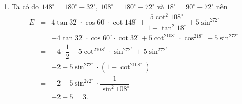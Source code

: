 \begin{bt}
{\begin{enumerate}
	\allowdisplaybreaks
	\begin{eqnarray*}
		D&=& \dfrac{12}{1+\tan^273^\circ} -4\tan 75^\circ\cdot\cot 105^\circ+12\sin^2 107^\circ-2 \tan 40^\circ \cdot \cos 60^\circ \cdot \tan 50^\circ\\
		&=&12\cos^273^\circ-4\tan75^\circ\cdot\cot(180^\circ-75^\circ)+12\sin^2(180^\circ-73^\circ)-2\tan(90^\circ-50)\cos60^\circ\tan 50^\circ\\
		&=&12\cos^273^\circ+4\tan75^\circ\cdot\cot75^\circ+12\sin^273^\circ-\cot 50^\circ\cdot \tan 50^\circ\cdot \cos 60^\circ\\
		&=&12+4-\dfrac{1}{2}=\dfrac{31}{2}.
	\end{eqnarray*}
	\item Ta có do $148^\circ=180^\circ-32^\circ$, $108^\circ=180^\circ-72^\circ$ và $18^\circ=90^\circ-72^\circ$ nên
	\allowdisplaybreaks
	\begin{eqnarray*}
		E&=&4 \tan 32^\circ \cdot \cos 60^\circ \cdot \cot 148^\circ+\dfrac{5 \cot^2 108^\circ}{1+\tan^2 18^\circ}+5\sin^272^\circ\\
		&=&-4 \tan 32^\circ \cdot \cos 60^\circ \cdot \cot 32^\circ+5\cot^2108^\circ\cdot\cos^218^\circ+5\sin^272^\circ\\
		&=&-4\cdot\dfrac{1}{2}+5\cot^2108^\circ\cdot\sin^272^\circ+5\sin^272^\circ\\
		&=&-2+5\sin^272^\circ\cdot\left(1+\cot^2108^\circ\right)\\
		&=&-2+5\sin^272^\circ\cdot \dfrac{1}{\sin^2 108^\circ}\\
		&=&-2+5=3.
	\end{eqnarray*}
\end{enumerate}	
}
\end{bt}

